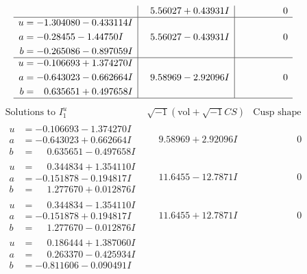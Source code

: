\documentclass[1p]{elsarticle_modified}
\theoremstyle{definition}
\newcommand{\I}{\sqrt{-1}}
\begin{document}
$$\begin{array}{c|c|c}
 & \phantom{-}5.56027 + 0.43931 I & \phantom{-0.000000 } 0 \\ \hline\begin{aligned}
u &= -1.304080 - 0.433114 I \\
a &= -0.28455 - 1.44750 I \\
b &= -0.265086 - 0.897059 I\end{aligned}
 & \phantom{-}5.56027 - 0.43931 I & \phantom{-0.000000 } 0 \\ \hline\begin{aligned}
u &= -0.106693 + 1.374270 I \\
a &= -0.643023 - 0.662664 I \\
b &= \phantom{-}0.635651 + 0.497658 I\end{aligned}
 & \phantom{-}9.58969 - 2.92096 I & \phantom{-0.000000 } 0\\
 \hline 
 \end{array}$$\newpage$$\begin{array}{c|c|c}  
\text{Solutions to }I^u_{1}& \I (\text{vol} + \sqrt{-1}CS) & \text{Cusp shape}\\
 \hline 
\begin{aligned}
u &= -0.106693 - 1.374270 I \\
a &= -0.643023 + 0.662664 I \\
b &= \phantom{-}0.635651 - 0.497658 I\end{aligned}
 & \phantom{-}9.58969 + 2.92096 I & \phantom{-0.000000 } 0 \\ \hline\begin{aligned}
u &= \phantom{-}0.344834 + 1.354110 I \\
a &= -0.151878 - 0.194817 I \\
b &= \phantom{-}1.277670 + 0.012876 I\end{aligned}
 & \phantom{-}11.6455 - 12.7871 I & \phantom{-0.000000 } 0 \\ \hline\begin{aligned}
u &= \phantom{-}0.344834 - 1.354110 I \\
a &= -0.151878 + 0.194817 I \\
b &= \phantom{-}1.277670 - 0.012876 I\end{aligned}
 & \phantom{-}11.6455 + 12.7871 I & \phantom{-0.000000 } 0 \\ \hline\begin{aligned}
u &= \phantom{-}0.186444 + 1.387060 I \\
a &= \phantom{-}0.263370 - 0.425934 I \\
b &= -0.811606 - 0.090491 I\end{aligned}

\end{array}$$
\end{document}
